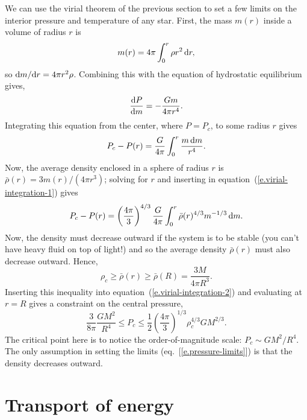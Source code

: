 We can use the virial theorem of the previous section to set a few limits on the interior pressure and temperature of any star.  First, the mass $m(r)$ inside a volume of radius $r$ is
\[ m(r) = 4\pi\int_{0}^{r} \rho r^{2}\,\mathrm{d} r, \]
so $\mathrm{d} m/\mathrm{d} r = 4\pi r^{2}\rho$. Combining this with the equation of hydrostatic equilibrium gives,
\[
\frac{\mathrm{d} P}{\mathrm{d} m} = -\frac{G m}{4\pi r^{4}}.
\]
Integrating this equation from the center, where $P = P_{c}$, to some radius $r$ gives
\begin{equation}\label{e.virial-integration-1}
P_{c} - P(r) = \frac{G}{4\pi}\int_{0}^{r} \frac{m \,\mathrm{d} m}{r^{4}}.
\end{equation}
Now, the average density enclosed in a sphere of radius $r$ is $\bar{\rho}(r) = 3m(r)/(4\pi r^{3})$; solving for $r$ and inserting in equation~(\ref{e.virial-integration-1}) gives
\begin{equation}\label{e.virial-integration-2}
P_{c} - P(r) = \left(\frac{4\pi}{3}\right)^{4/3} \frac{G}{4\pi}\int_{0}^{r} \bar{\rho}(r)^{4/3} m^{-1/3}\,\mathrm{d} m.
\end{equation}
Now, the density must decrease outward if the system is to be stable (you can't have heavy fluid on top of light!) and so the average density $\bar{\rho}(r)$ must also decrease outward. Hence,
\[ \rho_{c} \ge \bar{\rho}(r) \ge \bar{\rho}(R) = \frac{3M}{4\pi R^{3}}.\]
Inserting this inequality into equation~(\ref{e.virial-integration-2}) and evaluating at $r=R$ gives a constraint on the central pressure,
\begin{equation}\label{e.pressure-limits}
\frac{3}{8\pi} \frac{GM^{2}}{R^{4}} \le P_{c} \le \frac{1}{2} \left(\frac{4\pi}{3}\right)^{1/3} \rho_{c}^{4/3}G M^{2/3}.
\end{equation}
The critical point here is to notice the order-of-magnitude scale: $P_{c}\sim GM^{2}/R^{4}$. The only assumption in setting the limits (eq.~[\ref{e.pressure-limits}]) is that the density decreases outward.

\section{Transport of energy}\label{s.energy-transport-estimate}

